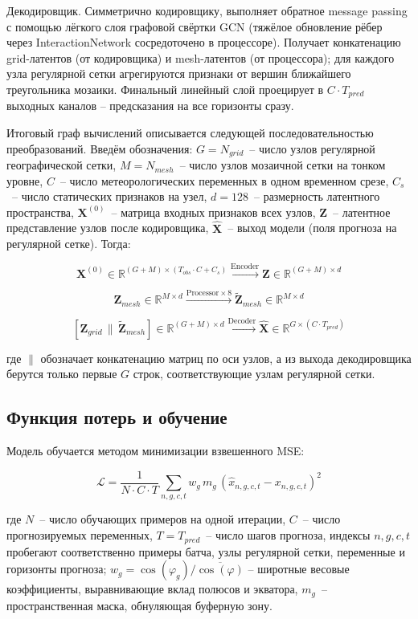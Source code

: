 \documentclass[14pt,a4paper]{extarticle}
\numberwithin{table}{section}
\numberwithin{figure}{section}
\numberwithin{equation}{section}
\begin{document}
Декодировщик. Симметрично кодировщику, выполняет
обратное message passing с помощью лёгкого слоя графовой свёртки GCN
(тяжёлое обновление рёбер через InteractionNetwork сосредоточено в
процессоре). Получает конкатенацию grid-латентов (от кодировщика) и
mesh-латентов (от процессора); для каждого узла регулярной сетки
агрегируются признаки от вершин ближайшего треугольника мозаики.
Финальный линейный слой проецирует в \(C \cdot T_{pred}\) выходных
каналов -- предсказания на все горизонты сразу.

Итоговый граф вычислений описывается следующей последовательностью
преобразований. Введём обозначения: \(G = N_{grid}\)~-- число узлов
регулярной географической сетки, \(M = N_{mesh}\)~-- число узлов
мозаичной сетки на тонком уровне, \(C\)~-- число метеорологических
переменных в одном временном срезе, \(C_s\)~-- число статических
признаков на узел, \(d = 128\)~-- размерность латентного пространства,
\(\mathbf{X}^{(0)}\)~-- матрица входных признаков всех узлов,
\(\mathbf{Z}\)~-- латентное представление узлов после кодировщика,
\(\hat{\mathbf{X}}\)~-- выход модели (поля прогноза на регулярной
сетке). Тогда:

\[\mathbf{X}^{(0)} \in \mathbb{R}^{(G+M)\times(T_{obs}\cdot C + C_s)} \xrightarrow{\text{Encoder}} \mathbf{Z} \in \mathbb{R}^{(G+M)\times d}\]

\[\mathbf{Z}_{mesh} \in \mathbb{R}^{M\times d} \xrightarrow{\text{Processor}\times 8} \tilde{\mathbf{Z}}_{mesh} \in \mathbb{R}^{M\times d}\]

\[[\mathbf{Z}_{grid} \,\|\, \tilde{\mathbf{Z}}_{mesh}] \in \mathbb{R}^{(G+M)\times d} \xrightarrow{\text{Decoder}} \hat{\mathbf{X}} \in \mathbb{R}^{G\times (C\cdot T_{pred})}\]

где \(\|\) обозначает конкатенацию матриц по оси узлов, а из выхода
декодировщика берутся только первые \(G\) строк, соответствующие узлам
регулярной сетки.

\subsection{Функция потерь и обучение}\label{ux444ux443ux43dux43aux446ux438ux44f-ux43fux43eux442ux435ux440ux44c-ux438-ux43eux431ux443ux447ux435ux43dux438ux435}

Модель обучается методом минимизации взвешенного MSE:

\[\mathcal{L} = \frac{1}{N \cdot C \cdot T} \sum_{n,g,c,t} w_g \, m_g \, \left(\hat{x}_{n,g,c,t} - x_{n,g,c,t}\right)^2\]

где \(N\)~-- число обучающих примеров на одной
итерации, \(C\)~-- число прогнозируемых переменных, \(T = T_{pred}\)~--
число шагов прогноза, индексы \(n, g, c, t\) пробегают соответственно
примеры батча, узлы регулярной сетки, переменные и горизонты прогноза;
\(w_g = \cos(\varphi_g) / \overline{\cos(\varphi)}\) -- широтные весовые
коэффициенты, выравнивающие вклад полюсов и экватора, \(m_g\)~--
пространственная маска, обнуляющая буферную зону.
\end{document}
